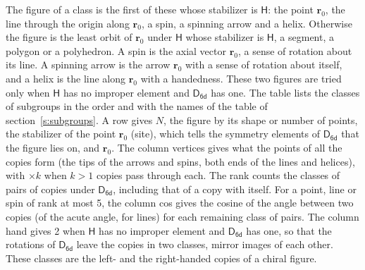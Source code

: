 \documentclass[10pt,a4paper]{article}
\numberwithin{equation}{section}
\newcommand{\grp}[1]{\mathsf{#1}}
\newcommand{\pointr}{\mathbf{r}}
\begin{document}
\leavevmode\label{n:head.figure}The figure of a class is the first of these whose stabilizer is $\grp{H}$: the point $\pointr_0$, the line through the origin along $\pointr_0$, a spin, a spinning arrow and a helix. Otherwise the figure is the least orbit of $\pointr_0$ under $\grp{H}$ whose stabilizer is $\grp{H}$, a segment, a polygon or a polyhedron. A spin is the axial vector $\pointr_0$, a sense of rotation about its line. A spinning arrow is the arrow $\pointr_0$ with a sense of rotation about itself, and a helix is the line along $\pointr_0$ with a handedness. These two figures are tried only when $\grp{H}$ has no improper element and $\grp{D_{6d}}$ has one. The table lists the classes of subgroups in the order and with the names of the table of section~\ref{s:subgroups}. \label{n:head.site}A row gives $N$, the figure by its shape or number of points, the stabilizer of the point $\pointr_0$ (site), which tells the symmetry elements of $\grp{D_{6d}}$ that the figure lies on, and $\pointr_0$. \label{n:head.vertices}The column vertices gives what the points of all the copies form (the tips of the arrows and spins, both ends of the lines and helices), with ${\times}k$ when $k > 1$ copies pass through each. \label{n:head.rank}The rank counts the classes of pairs of copies under $\grp{D_{6d}}$, including that of a copy with itself. \label{n:head.cos}For a point, line or spin of rank at most 5, the column cos gives the cosine of the angle between two copies (of the acute angle, for lines) for each remaining class of pairs. \label{n:head.hand}The column hand gives 2 when $\grp{H}$ has no improper element and $\grp{D_{6d}}$ has one, so that the rotations of $\grp{D_{6d}}$ leave the copies in two classes, mirror images of each other. These classes are the left- and the right-handed copies of a chiral figure.
\end{document}
